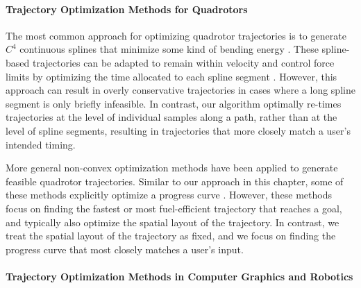 \paragraph{Trajectory Optimization Methods for Quadrotors}


The most common approach for optimizing quadrotor trajectories is to generate $C^4$ continuous splines that minimize some kind of bending energy \cite{bry:2015,deits:2015,joubert:2015,mellinger:2011}.
These spline-based trajectories can be adapted to remain within velocity and control force limits by optimizing the time allocated to each spline segment \cite{bry:2015,mellinger:2011}.
However, this approach can result in overly conservative trajectories in cases where a long spline segment is only briefly infeasible.
In contrast, our algorithm optimally re-times trajectories at the level of individual samples along a path, rather than at the level of spline segments, resulting in trajectories that more closely match a user's intended timing.

More general non-convex optimization methods have been applied to generate feasible quadrotor trajectories.
Similar to our approach in this chapter, some of these methods explicitly optimize a progress curve \cite{bouktir:2008,cowling:2007,vanloock:2013}.
However, these methods focus on finding the fastest or most fuel-efficient trajectory that reaches a goal, and typically also optimize the spatial layout of the trajectory.
In contrast, we treat the spatial layout of the trajectory as fixed, and we focus on finding the progress curve that most closely matches a user's input.

\paragraph{Trajectory Optimization Methods in Computer Graphics and Robotics}

